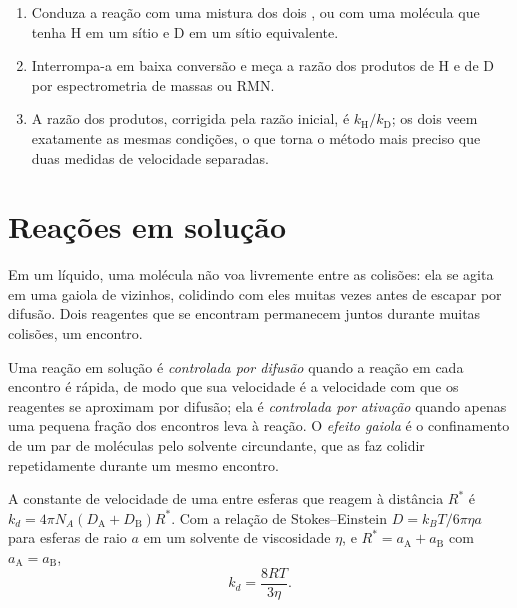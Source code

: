 \begin{method}\label{met:b3:rate-theories:kie}
\begin{enumerate}
  \item Conduza a reação com uma mistura dos dois , ou com uma
        molécula que tenha H em um sítio e D em um sítio equivalente.
  \item Interrompa-a em baixa conversão e meça a razão dos produtos de H e de D
        por espectrometria de massas ou RMN.
  \item A razão dos produtos, corrigida pela razão inicial, é $k_{\mathrm H}/k_{\mathrm D}$; os dois
         veem exatamente as mesmas condições, o que torna o método
        mais preciso que duas medidas de velocidade separadas.
\end{enumerate}
\end{method}

\section{Reações em solução}

Em um líquido, uma molécula não voa livremente entre as colisões: ela se agita em
uma gaiola de vizinhos, colidindo com eles muitas vezes antes de escapar por
difusão. Dois reagentes que se encontram permanecem juntos durante muitas
colisões, um encontro.

\begin{definition}\label{def:b3:rate-theories:diffusion}
Uma reação em solução é \emph{controlada por difusão}
quando a reação em cada encontro é rápida, de modo que sua velocidade é a
velocidade com que os reagentes se aproximam por difusão; ela é
\emph{controlada por ativação} quando apenas uma pequena
fração dos encontros leva à reação. O \emph{efeito gaiola}
é o confinamento de um par de moléculas pelo solvente circundante, que as
faz colidir repetidamente durante um mesmo encontro.
\end{definition}

\begin{proposition}\label{prop:b3:rate-theories:smoluchowski}
A constante de velocidade de uma  entre esferas que
reagem à distância $R^*$ é $k_d = 4\pi N_A(D_{\mathrm A} + D_{\mathrm B})R^*$. Com a relação de
Stokes--Einstein $D = k_BT/6\pi\eta a$ para esferas de raio $a$ em um solvente de
viscosidade $\eta$, e $R^* = a_{\mathrm A} + a_{\mathrm B}$ com $a_{\mathrm A} = a_{\mathrm B}$,
\[
  k_d = \frac{8RT}{3\eta} .
\]
\end{proposition}

